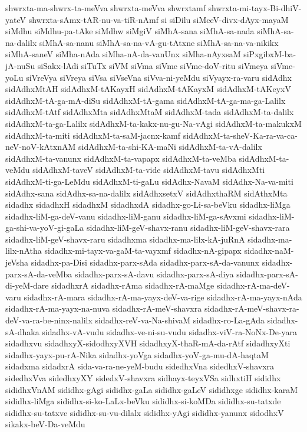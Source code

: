 {shwrxta-ma-shwrx-ta-meVva
shwrxta-meVva
shwrxtamf
shwrxta-mi-tayx-Bi-dhiV-yateV
shwrxta-sAmx-tAR-nu-va-tiR-nAmf
si
siDilu
siMceV-divx-dAyx-mayaM
siMdhu
siMdhu-pa-tAke
siMdhw
siMgiV
siMhA-sana
siMhA-sa-nada
siMhA-sa-na-dalilx
siMhA-sa-nanu
siMhA-sa-na-vA-gu-tAtxne
siMhA-sa-na-va-nikikx
siMhA-saneV
siMha-nAda
siMha-nA-da-vanUnx
siMha-nAyxsaM
siPxgibxM-ba-jA-nuSu
siSakx-lAdi
siTuTx
siVM
siVma
siVme
siVme-doV-ritu
siVmeya
siVme-yoLu
siVreVya
siVreya
siVsa
siVseVna
siVva-ni-yeMdu
siVyayx-ra-varu
sidAdhx
sidAdhxMtAH
sidAdhxM-tAKayxH
sidAdhxM-tAKayxM
sidAdhxM-tAKeyxV
sidAdhxM-tA-ga-mA-diSu
sidAdhxM-tA-gama
sidAdhxM-tA-ga-ma-ga-Lalilx
sidAdhxM-tAtf
sidAdhxMta
sidAdhxMtaM
sidAdhxM-tada
sidAdhxM-ta-dalilx
sidAdhxM-ta-ga-Lalilx
sidAdhxM-ta-kakx-nu-gu-Na-vAgi
sidAdhxM-ta-makukxM
sidAdhxM-ta-miti
sidAdhxM-ta-saM-jacnx-kamf
sidAdhxM-ta-sheV-Ka-ra-va-ca-neV-noV-kAtxnAM
sidAdhxM-ta-shi-KA-maNi
sidAdhxM-ta-vA-dalilx
sidAdhxM-ta-vanunx
sidAdhxM-ta-vapapx
sidAdhxM-ta-veMba
sidAdhxM-ta-veMdu
sidAdhxM-taveV
sidAdhxM-ta-vide
sidAdhxM-tavu
sidAdhxMti
sidAdhxM-ti-ga-LeMdu
sidAdhxM-ti-gaLu
sidAdhx-NavaM
sidAdhx-Na-va-miti
sidAdhx-sana
sidAdhx-sa-na-dalilx
sidAdhxsetxV
sidAdhxthaRM
sidAthxMta
sidadhx
sidadhxH
sidadhxM
sidadhxdA
sidadhx-go-Li-sa-beVku
sidadhx-liMga
sidadhx-liM-ga-deV-vanu
sidadhx-liM-ganu
sidadhx-liM-ga-sAvxmi
sidadhx-liM-ga-shi-va-yoV-gi-gaLa
sidadhx-liM-geV-shavx-ranu
sidadhx-liM-geV-shavx-rara
sidadhx-liM-geV-shavx-raru
sidadhxma
sidadhx-ma-lilx-kA-juRnA
sidadhx-ma-lilx-nAtha
sidadhx-mi-tayx-va-gaM-ta-vayxmf
sidadhx-nA-gipapx
sidadhx-naM-jeVsha
sidadhx-pa-Disi
sidadhx-parx-sAda
sidadhx-parx-sA-da-vanunx
sidadhx-parx-sA-da-veMba
sidadhx-parx-sA-davu
sidadhx-parx-sA-diya
sidadhx-parx-sA-di-yeM-dare
sidadhxrA
sidadhx-rAma
sidadhx-rA-maMge
sidadhx-rA-ma-deV-varu
sidadhx-rA-mara
sidadhx-rA-ma-yayx-deV-va-rige
sidadhx-rA-ma-yayx-nAda
sidadhx-rA-ma-yayx-na-nuva
sidadhx-rA-meV-shavxra
sidadhx-rA-meV-shavx-ra-deV-va-ra-be-ninx-nalilx
sidadhx-reV-va-Na-shivaM
sidadhx-ro-La-gAda
sidadhx-sA-dhaka
sidadhx-vA-vudu
sidadhx-ve-ni-su-vudu
sidadhx-viV-ra-NoNx-De-yara
sidadhxvu
sidadhxyX-sidodhxyXVH
sidadhxyX-thaR-mA-da-rAtf
sidadhxyXti
sidadhx-yayx-pu-rA-Nika
sidadhx-yoVga
sidadhx-yoV-ga-mu-dA-haqtaM
sidadxma
sidadxrA
sida-va-ra-ne-yeM-budu
sidedhxVna
sidedhxV-shavxra
sidedhxVva
sidedhxyXY
sidedxV-shavxra
sidhayx-teyxVSa
sidhxtiH
sididhx
sididhxVnAM
sididhx-gAgi
sididhx-gaLa
sididhx-gaLeV
sididhxge
sididhx-karaM
sididhx-liMga
sididhx-si-ko-LaLx-beVku
sididhx-si-koMDa
sididhx-su-tatxde
sididhx-su-tatxve
sididhx-su-vu-dilalx
sididhx-yAgi
sididhx-yanunx
sidodhxV
sikakx-beV-Da-veMdu
}
